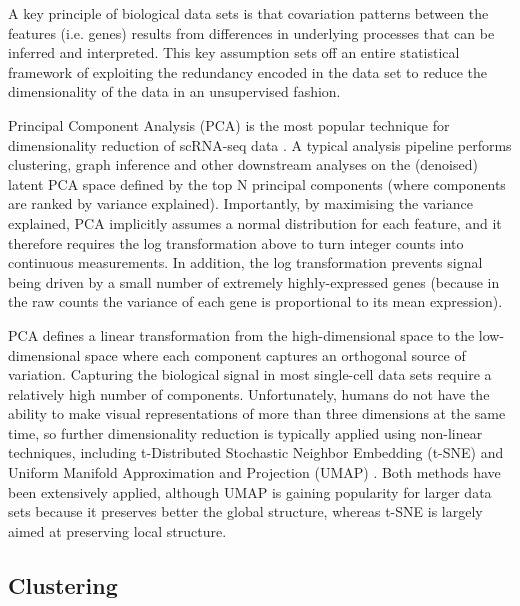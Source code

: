 A key principle of biological data sets is that covariation patterns between the features (i.e. genes) results from differences in underlying processes that can be inferred and interpreted. This key assumption sets off an entire statistical framework of exploiting the redundancy encoded in the data set to reduce the dimensionality of the data in an unsupervised fashion.

Principal Component Analysis (PCA) is the most popular technique for dimensionality reduction of scRNA-seq data \cite{Luecken2019}. A typical analysis pipeline performs clustering, graph inference and other downstream analyses on the (denoised) latent PCA space defined by the top N principal components (where components are ranked by variance explained). Importantly, by maximising the variance explained, PCA implicitly assumes a normal distribution for each feature, and it therefore requires the log transformation above to turn integer counts into continuous measurements. In addition, the log transformation prevents signal being driven by a small number of extremely highly-expressed genes (because in the raw counts the variance of each gene is proportional to its mean expression). 

PCA defines a linear transformation from the high-dimensional space to the low-dimensional space where each component captures an orthogonal source of variation. Capturing the biological signal in most single-cell data sets require a relatively high number of components. Unfortunately, humans do not have the ability to make visual representations of more than three dimensions at the same time, so further dimensionality reduction is typically applied using non-linear techniques, including t-Distributed Stochastic Neighbor Embedding (t-SNE) \cite{vanDerMaaten2008} and Uniform Manifold Approximation and Projection (UMAP) \cite{McInnes2018}. Both methods have been extensively applied, although UMAP is gaining popularity for larger data sets because it preserves better the global structure, whereas t-SNE is largely aimed at preserving local structure. 

\subsection{Clustering}

